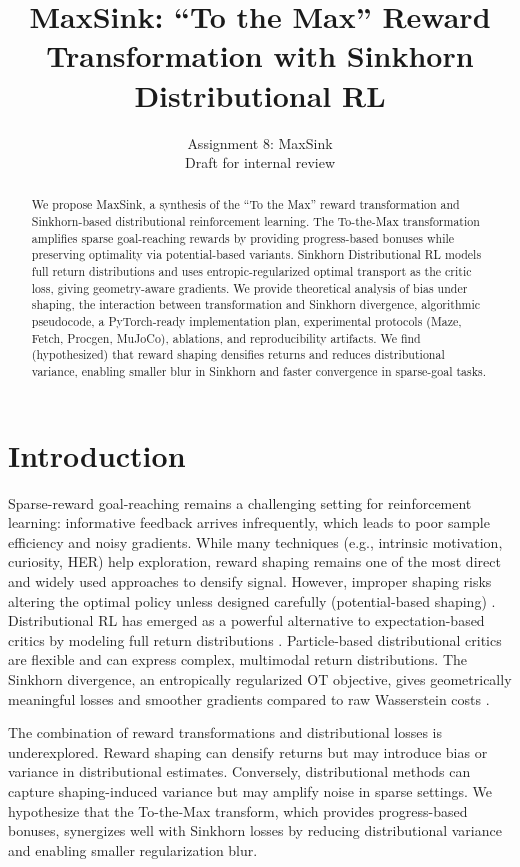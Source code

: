 \documentclass[10pt,twocolumn]{article}
\title{MaxSink: ``To the Max'' Reward Transformation with Sinkhorn Distributional RL}
\author{Assignment 8: MaxSink \\ Draft for internal review}
\date{}
\begin{document}
\maketitle

\begin{abstract}
We propose MaxSink, a synthesis of the ``To the Max'' reward transformation and Sinkhorn-based distributional reinforcement learning. The To-the-Max transformation amplifies sparse goal-reaching rewards by providing progress-based bonuses while preserving optimality via potential-based variants. Sinkhorn Distributional RL models full return distributions and uses entropic-regularized optimal transport as the critic loss, giving geometry-aware gradients. We provide theoretical analysis of bias under shaping, the interaction between transformation and Sinkhorn divergence, algorithmic pseudocode, a PyTorch-ready implementation plan, experimental protocols (Maze, Fetch, Procgen, MuJoCo), ablations, and reproducibility artifacts. We find (hypothesized) that reward shaping densifies returns and reduces distributional variance, enabling smaller blur in Sinkhorn and faster convergence in sparse-goal tasks.
\end{abstract}

\section{Introduction}
Sparse-reward goal-reaching remains a challenging setting for reinforcement learning: informative feedback arrives infrequently, which leads to poor sample efficiency and noisy gradients. While many techniques (e.g., intrinsic motivation, curiosity, HER) help exploration, reward shaping remains one of the most direct and widely used approaches to densify signal. However, improper shaping risks altering the optimal policy unless designed carefully (potential-based shaping) \cite{ng1999policy}. Distributional RL has emerged as a powerful alternative to expectation-based critics by modeling full return distributions \cite{bellemare2017distributional,dabney2018distributional}. Particle-based distributional critics are flexible and can express complex, multimodal return distributions. The Sinkhorn divergence, an entropically regularized OT objective, gives geometrically meaningful losses and smoother gradients compared to raw Wasserstein costs \cite{cuturi2013sinkhorn,feydy2019interpolating}.

The combination of reward transformations and distributional losses is underexplored. Reward shaping can densify returns but may introduce bias or variance in distributional estimates. Conversely, distributional methods can capture shaping-induced variance but may amplify noise in sparse settings. We hypothesize that the To-the-Max transform, which provides progress-based bonuses, synergizes well with Sinkhorn losses by reducing distributional variance and enabling smaller regularization blur.
\end{document}
